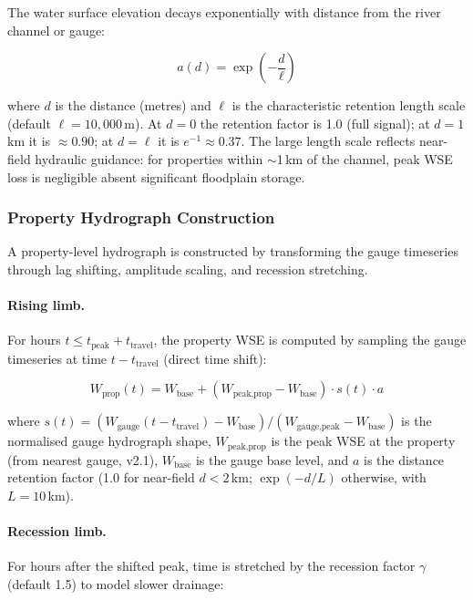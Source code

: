 \documentclass[11pt,a4paper]{article}
\begin{document}
The water surface elevation decays exponentially with distance from the river channel or
gauge:

\begin{equation}
    a(d) = \exp\!\left(-\frac{d}{\ell}\right)
    \label{eq:attenuation}
\end{equation}

\noindent where $d$ is the distance (metres) and $\ell$ is the characteristic retention
length scale (default $\ell = 10{,}000\,$m). At $d = 0$ the retention factor is 1.0
(full signal); at $d = 1\,$km it is $\approx 0.90$; at $d = \ell$ it is
$e^{-1} \approx 0.37$. The large length scale reflects near-field hydraulic
guidance: for properties within $\sim$1\,km of the channel, peak WSE loss is
negligible absent significant floodplain storage.

\subsubsection{Property Hydrograph Construction}

A property-level hydrograph is constructed by transforming the gauge timeseries through
lag shifting, amplitude scaling, and recession stretching.

\paragraph{Rising limb.} For hours $t \leq t_{\text{peak}} + t_{\text{travel}}$, the
property WSE is computed by sampling the gauge timeseries at time $t - t_{\text{travel}}$
(direct time shift):

\begin{equation}
    W_{\text{prop}}(t) = W_{\text{base}} +
    (W_{\text{peak,prop}} - W_{\text{base}}) \cdot s(t) \cdot a
    \label{eq:rising}
\end{equation}

\noindent where $s(t) = (W_{\text{gauge}}(t - t_{\text{travel}}) - W_{\text{base}}) /
(W_{\text{gauge,peak}} - W_{\text{base}})$ is the normalised gauge hydrograph shape,
$W_{\text{peak,prop}}$ is the peak WSE at the property (from nearest gauge, v2.1),
$W_{\text{base}}$ is the gauge base level, and $a$ is the distance retention factor
(1.0 for near-field $d < 2\,$km; $\exp(-d/L)$ otherwise, with $L = 10\,$km).

\paragraph{Recession limb.} For hours after the shifted peak, time is stretched by the
recession factor $\gamma$ (default 1.5) to model slower drainage:
\end{document}
